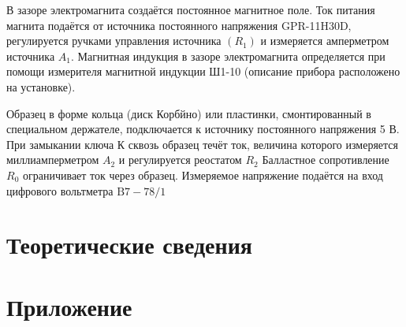 \documentclass[a4paper, 12pt]{article}
\begin{document}
В зазоре электромагнита создаётся постоянное магнитное поле. Ток питания магнита подаётся от источника постоянного напряжения GPR-11H30D, регулируется ручками управления источника $\left(R_{1}\right)$ и измеряется амперметром источника $A_{1}$. Магнитная индукция в зазоре электромагнита определяется при помощи измерителя магнитной индукции Ш1-10 (описание прибора расположено на установке).

Образец в форме кольца (диск Корбйно) или пластинки, смонтированный в специальном держателе, подключается к источнику постоянного напряжения 5 В. При замыкании ключа К сквозь образец течёт ток, величина которого измеряется миллиамперметром $A_{2}$ и регулируется реостатом $R_{2}$ Балластное сопротивление $R_{0}$ ограничивает ток через образец. Измеряемое напряжение подаётся на вход цифрового вольтметра $\mathrm{B} 7-78 / 1$

\section{Теоретические сведения}

\section{Приложение}
\end{document}
